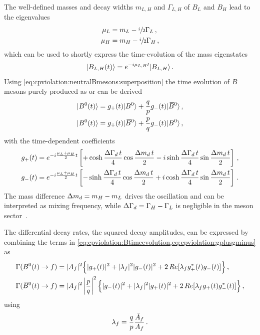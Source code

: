 The well-defined masses and decay widths
$m_{L,H}$ and $\Gamma_{L,H}$ of $B_L$ and $B_H$ lead to the eigenvalues
\begin{align}
\begin{split}
	\mu_L &= m_L - \sfrac{i}{2}\Gamma_L \,,\\
	\mu_H &= m_H - \sfrac{i}{2}\Gamma_H \,,
\end{split}
\end{align}
which can be used to shortly express the time-evolution of the mass eigenstates
\begin{align}
	|B_{L,H}(t)\rangle = e^{-i\mu_{L,H}t} |B_{L,H}\rangle\,.
\end{align}
Using \cref{eq:cpviolation:neutralBmesons:superposition} the time evolution of
$B$ mesons purely produced as \Bd or \Bdb can be derived
\begin{align}
\begin{split}
	|{{B}^0}(t)\rangle = g_+(t)|{{B}^0}\rangle  + \frac qp g_-(t)|{{\kern 0.18em\overline{\kern -0.18em B}{}}{}^0}\rangle\,,\\
	|{{B}^0}(t)\rangle = g_+(t)|{{\kern 0.18em\overline{\kern -0.18em B}{}}{}^0}\rangle + \frac pq g_-(t)|{{B}^0}\rangle \,,
\end{split}
\label{eq:cpviolation:Btimeevolution}
\end{align}
with the time-dependent coefficients
\begin{align}
\begin{split}
	g_+(t) = e^{-i\frac{\mu_L + \mu_H}{2}t}\left[+\cosh\frac{{\Delta\Gamma_{{d}}}\,t}{4} \cos\frac{{\Delta m_{{d}}}\,t}{2} - i \sinh\frac{{\Delta\Gamma_{{d}}}\,t}{4} \sin\frac{{\Delta m_{{d}}}\,t}{2}\right]\,,\\
	g_-(t) = e^{-i\frac{\mu_L + \mu_H}{2}t}\left[-\sinh\frac{{\Delta\Gamma_{{d}}}\,t}{4} \cos\frac{{\Delta m_{{d}}}\,t}{2} + i \cosh\frac{{\Delta\Gamma_{{d}}}\,t}{4} \sin\frac{{\Delta m_{{d}}}\,t}{2}\right]\,.
\end{split}
\label{eq:cpviolation:gplusgminus}
\end{align}
The mass difference ${\Delta m_{{d}}} = m_H - m_L$ drives the oscillation and can be
interpreted as mixing frequency, while ${\Delta\Gamma_{{d}}} = \Gamma_H - \Gamma_L$ is
negligible in the \Bd meson sector~\cite{HFAG}.

The differential decay rates, \ie the squared decay amplitudes, can be
expressed by combining the terms in
\cref{eq:cpviolation:Btimeevolution,eq:cpviolation:gplusgminus} as
\begin{align}
\begin{split}
	\Gamma({{B}^0}(t)\rightarrow f) &= |A_{f}|^2 \Big\{|g_+(t)|^2 + |\lambda_f|^2|g_-(t)|^2 + 2\,Re[\lambda_f g_+^\ast(t)g_-(t)]\Big\}\,,\\
	\Gamma({{\kern 0.18em\overline{\kern -0.18em B}{}}{}^0}(t)\rightarrow f) &= |A_{f}|^2 \left|\frac pq \right|^2 \Big\{|g_-(t)|^2 + |\lambda_f|^2|g_+(t)|^2 + 2\,Re[\lambda_f g_+(t)g_-^{\ast}(t)]\Big\}\,,
\end{split}
\label{eq:cpviolation:complexdecayrates}
\end{align}
using
\begin{align}
	\lambda_f = \frac qp \frac{\bar{A}_{f}}{A_{f}}\,.
\label{eq:cpviolation:lambda}
\end{align}
